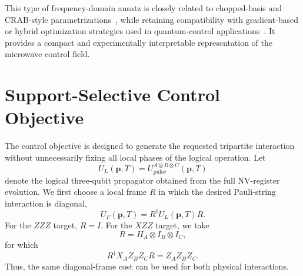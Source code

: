 \documentclass[
  aps,
  pra,
  reprint,            %
  superscriptaddress, %
  amsmath,amssymb,
  notitlepage
]{revtex4-2}
\begin{document}
This type of frequency-domain ansatz is closely related to chopped-basis and CRAB-style parametrizations~\cite{caneva2011chopped,rach2015dressing,doria2011optimal,muellercontrol}, while retaining compatibility with gradient-based or hybrid optimization strategies used in quantum-control applications~\cite{khaneja2005optimal,de2011second,motzoi2011optimal,sorensen2018quantum,sorensen2020optimization,preti2022continuous}. It provides a compact and experimentally interpretable representation of the microwave control field.

\section{Support-Selective Control Objective}
\label{sec:control_objective}

The control objective is designed to generate the requested tripartite interaction without unnecessarily fixing all local phases of the logical operation. Let
\begin{equation}
U_L(\mathbf p,T)
=
U_{\mathrm{pulse}}^{A\otimes B\otimes C}(\mathbf p,T)
\label{eq:logical_pulse_short}
\end{equation}
denote the logical three-qubit propagator obtained from the full NV-register evolution. We first choose a local frame $R$ in which the desired Pauli-string interaction is diagonal,
\begin{equation}
U_F(\mathbf p,T)
=
R^\dagger U_L(\mathbf p,T)R.
\label{eq:framed_logical_propagator}
\end{equation}
For the $ZZZ$ target, $R=I$. For the $XZZ$ target, we take
\begin{equation}
R=H_A\otimes I_B\otimes I_C,
\end{equation}
for which
\begin{equation}
R^\dagger X_AZ_BZ_C R=Z_AZ_BZ_C.
\end{equation}
Thus, the same diagonal-frame cost can be used for both physical interactions.
\end{document}
